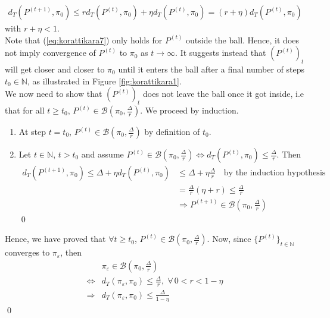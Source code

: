 \documentclass[11pt,a4paper]{report}\usepackage[]{graphicx}\usepackage[]{color}
\begin{document}
\begin{align}
\label{eq:korattikara7}
d_T(P^{(t+1)},\pi_0)\leq rd_T(P^{(t)},\pi_0)+\eta d_T(P^{(t)},\pi_0)=(r+\eta)d_T(P^{(t)},\pi_0)
\end{align}
with $r+\eta <1$.\\
Note that (\ref{eq:korattikara7}) only holds for $P^{(t)}$ outside the ball. Hence, it does not imply convergence of $P^{(t)}$ to $\pi_0$ as $t\rightarrow\infty$. It suggests instead that $(P^{(t)})_t$ will get closer and closer to $\pi_0$ until it enters the ball after a final number of steps $t_0 \in \mathbb{N}$, as illustrated in Figure \ref{fig:korattikara1}.\\
We now need to show that $(P^{(t)})_t$ does not leave the ball once it got inside, i.e that for all $t\geq t_0$, $P^{(t)}\in\mathcal{B}(\pi_0,\frac{\Delta}{r})$. We proceed by induction.
\begin{enumerate}
\item At step $t=t_0$, $P^{(t)}\in\mathcal{B}(\pi_0,\frac{\Delta}{r})$ by definition of $t_0$.
\item Let $t\in\mathbb{N}$, $t>t_0$ and assume $P^{(t)}\in\mathcal{B}(\pi_0,\frac{\Delta}{r})\Leftrightarrow d_T(P^{(t)},\pi_0)\leq\frac{\Delta}{r}$. Then
\begin{align*}
d_T(P^{(t+1)},\pi_0)\leq\Delta+\eta d_T(P^{(t)},\pi_0)&\leq\Delta+\eta\frac{\Delta}{r}\quad\text{by the induction hypothesis}\\
&=\frac{\Delta}{r}(\eta+r)\leq\frac{\Delta}{r}\\
&\Rightarrow P^{(t+1)}\in\mathcal{B}(\pi_0,\frac{\Delta}{r})
\end{align*}\qed
\end{enumerate}
Hence, we have proved that $\forall t\geq t_0$, $P^{(t)}\in\mathcal{B}(\pi_0,\frac{\Delta}{r})$. Now, since $\{P^{(t)}\}_{t\in\mathbb{N}}$ converges to $\pi_\varepsilon$, then 
\begin{align}
\label{eq:korattikara8}
&\pi_\varepsilon\in\mathcal{B}(\pi_0,\frac{\Delta}{r})\nonumber\\
\Leftrightarrow & d_T(\pi_\varepsilon,\pi_0)\leq\frac{\Delta}{r},\;\forall \, 0<r<1-\eta\nonumber\\
\Rightarrow & d_T(\pi_\varepsilon,\pi_0)\leq\frac{\Delta}{1-\eta}
\end{align}\qed
\end{document}
